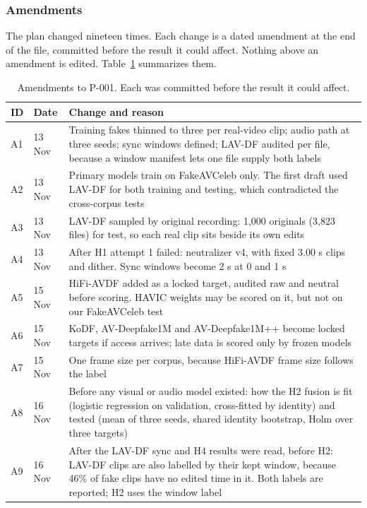 \subsubsection{Amendments}

The plan changed nineteen times. Each change is a dated amendment at the end of
the file, committed before the result it could affect. Nothing above an
amendment is edited. Table~\ref{tab:amendments} summarizes them.

\begin{table}[ht]
    \centering
    \small
    \caption{Amendments to P-001. Each was committed before the result it could affect.}
    \label{tab:amendments}
    \begin{tabularx}{\textwidth}{@{}l l >{\raggedright\arraybackslash}X@{}}
        \toprule
        \textbf{ID} & \textbf{Date} & \textbf{Change and reason} \\
        \midrule
        A1 & 13 Nov & Training fakes thinned to three per real-video clip; audio path at three seeds; sync windows defined; LAV-DF audited per file, because a window manifest lets one file supply both labels \\
        A2 & 13 Nov & Primary models train on FakeAVCeleb only. The first draft used LAV-DF for both training and testing, which contradicted the cross-corpus tests \\
        A3 & 13 Nov & LAV-DF sampled by original recording: 1,000 originals (3,823 files) for test, so each real clip sits beside its own edits \\
        A4 & 13 Nov & After H1 attempt 1 failed: neutralizer v4, with fixed 3.00 s clips and dither. Sync windows become 2 s at 0 and 1 s \\
        A5 & 15 Nov & HiFi-AVDF added as a locked target, audited raw and neutral before scoring. HAVIC weights may be scored on it, but not on our FakeAVCeleb test \\
        A6 & 15 Nov & KoDF, AV-Deepfake1M and AV-Deepfake1M++ become locked targets if access arrives; late data is scored only by frozen models \\
        A7 & 15 Nov & One frame size per corpus, because HiFi-AVDF frame size follows the label \\
        A8 & 16 Nov & Before any visual or audio model existed: how the H2 fusion is fit (logistic regression on validation, cross-fitted by identity) and tested (mean of three seeds, shared identity bootstrap, Holm over three targets) \\
        A9 & 16 Nov & After the LAV-DF sync and H4 results were read, before H2: LAV-DF clips are also labelled by their kept window, because 46\% of fake clips have no edited time in it. Both labels are reported; H2 uses the window label \\

\end{tabularx}
\end{table}

